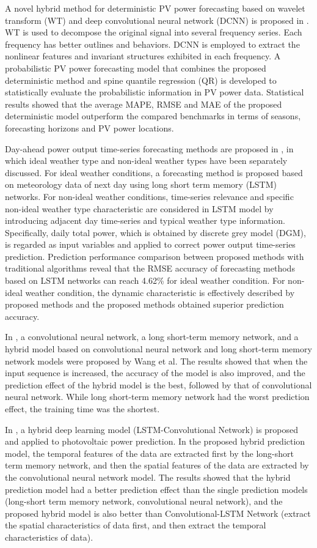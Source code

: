A novel hybrid method for deterministic PV power forecasting based on wavelet transform (WT) and deep convolutional neural network (DCNN) is proposed in \cite{WANG2017409}.
WT is used to decompose the original signal into several frequency series.
Each frequency has better outlines and behaviors.
DCNN is employed to extract the nonlinear features and invariant structures exhibited in each frequency. 
A probabilistic PV power forecasting model that combines the proposed deterministic method and spine quantile regression (QR) is developed to statistically evaluate the probabilistic information in PV power data.
Statistical results showed that the average MAPE, RMSE and MAE of the proposed deterministic model outperform the compared benchmarks in terms of seasons, forecasting horizons and PV power locations.

Day-ahead power output time-series forecasting methods are proposed in \cite{GAO2019115838}, in which ideal weather type and non-ideal weather types have been separately discussed.
For ideal weather conditions, a forecasting method is proposed based on meteorology data of next day using long short term memory (LSTM) networks.
For non-ideal weather conditions, time-series relevance and specific non-ideal weather type characteristic are considered in LSTM model by introducing adjacent day time-series and typical weather type information.
Specifically, daily total power, which is obtained by discrete grey model (DGM), is regarded as input variables and applied to correct power output time-series prediction.
Prediction performance comparison between proposed methods with traditional algorithms reveal that the RMSE accuracy of forecasting methods based on LSTM networks can reach 4.62\% for ideal weather condition.
For non-ideal weather condition, the dynamic characteristic is effectively described by proposed methods and the proposed methods obtained superior prediction accuracy.

In \cite{WANG2019113315}, a convolutional neural network, a long short-term memory network, and a hybrid model based on convolutional neural network and long short-term memory network models were proposed by Wang et al.
The results showed that when the input sequence is increased, the accuracy of the model is also improved, and the prediction effect of the hybrid model is the best, followed by that of convolutional neural network.
While long short-term memory network had the worst prediction effect, the training time was the shortest.

In \cite{WANG2019116225}, a hybrid deep learning model (LSTM-Convolutional Network) is proposed and applied to photovoltaic power prediction.
In the proposed hybrid prediction model, the temporal features of the data are extracted first by the long-short term memory network, and then the spatial features of the data are extracted by the convolutional neural network model.
The results showed that the hybrid prediction model had a better prediction effect than the single prediction models (long-short term memory network, convolutional neural network), and the proposed hybrid model is also better than Convolutional-LSTM Network (extract the spatial characteristics of data first, and then extract the temporal characteristics of data).

